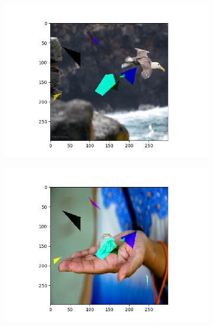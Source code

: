 \documentclass[conference]{IEEEtran}
\begin{document}
\begin{figure}[htbp]
\centering
\begin{subfigure}{.3\textwidth}
  \includegraphics[width=1\linewidth]{fig/albatross-mortarboard.png}
\end{subfigure}
\begin{subfigure}{.3\textwidth}
  \includegraphics[width=1\linewidth]{fig/hermitcrab-motarboard.png}
\end{subfigure}
\begin{subfigure}{.3\textwidth}

\end{subfigure}
\end{figure}
\end{document}
